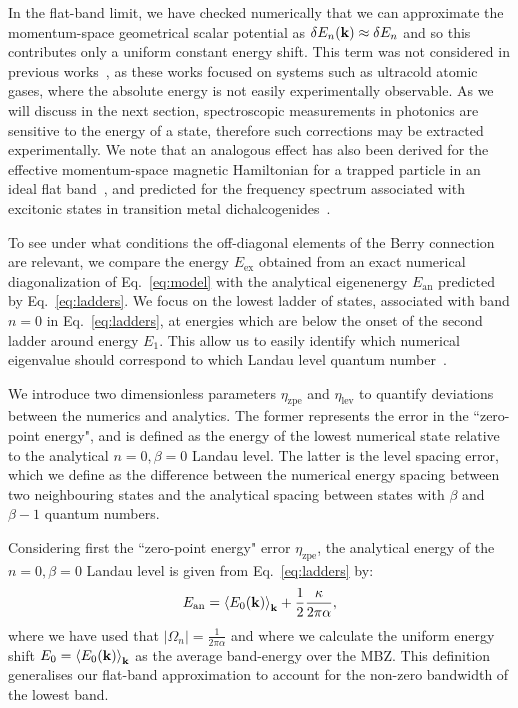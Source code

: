 In the flat-band limit, we have checked numerically that we can
approximate the momentum-space geometrical scalar potential as $\delta
E_n(\mathbf{k}) \approx \delta E_n$ and so this contributes only a uniform
constant energy shift. This term was not considered in previous
works~\cite{price2014magnetic, ozawa2014momhh}, as these works focused
on systems such as ultracold atomic gases, where the absolute energy
is not easily experimentally observable. As we will discuss in the
next section, spectroscopic measurements in photonics are sensitive to
the energy of a state, therefore such corrections may be extracted
experimentally. We note that an analogous effect has also been derived
for the effective momentum-space magnetic Hamiltonian for a trapped
particle in an ideal flat band~\cite{Claassen_prl_2015}, and predicted
for the frequency spectrum associated with excitonic states in
transition metal dichalcogenides~\cite{srivastava:2015}.

To see under what conditions the off-diagonal elements of the Berry
connection are relevant, we compare the energy $E_{\text{ex}}$
obtained from an exact numerical diagonalization of Eq.~\eqref{eq:model}
with the analytical eigenenergy $ E_{\text{an}}$ predicted by
Eq.~\eqref{eq:ladders}. We focus on the lowest ladder of states,
associated with band $n=0$ in Eq.~\eqref{eq:ladders}, at energies which
are below the onset of the second ladder around energy $E_1$. This
allow us to easily identify which numerical eigenvalue should
correspond to which Landau level quantum
number~\cite{price2014magnetic}.

We introduce two dimensionless parameters $\eta_{\text{zpe}}$ and
$\eta_{\text{lev}}$ to quantify deviations between the numerics and
analytics. The former represents the error in the ``zero-point
energy", and is defined as the energy of the lowest numerical state
relative to the analytical $n=0, \beta=0$ Landau level. The latter is the
level spacing error, which we define as the difference between the
numerical energy spacing between two neighbouring states and the
analytical spacing between states with $\beta$ and $\beta-1$ quantum
numbers.

Considering first the ``zero-point energy" error $\eta_{\text{zpe}}$,
the analytical energy of the $n=0, \beta=0$ Landau level is given from
Eq.~\eqref{eq:ladders} by:
%
\begin{equation} E_{\text{an}} = \left<E_0(\mathbf{k})\right>_{\mathbf{k}} +
\frac{1}{2}\frac{\kappa}{2\pi\alpha} ,
\end{equation}
%
where we have used that $|\Omega_n| = \frac{1}{2\pi\alpha}$ and where
we calculate the uniform energy shift
$E_0=\left<E_0(\mathbf{k})\right>_{\mathbf{k}}$ as the average band-energy
over the MBZ. This definition generalises our flat-band approximation
to account for the non-zero bandwidth of the lowest band.

